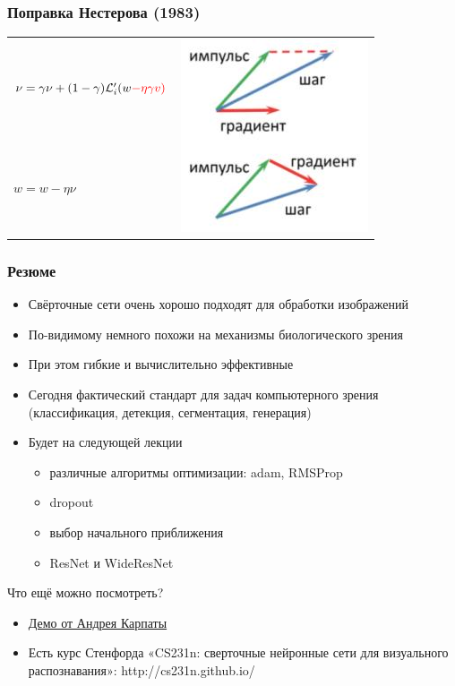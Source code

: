 \documentclass[fullscreen=true, bookmarks=true, hyperref={pdfencoding=unicode}]{beamer}
\begin{document}
\begin{frame}
  \frametitle{Поправка Нестерова (1983)}

\begin{tabular}{lr}
  $\nu = \gamma \nu + (1 - \gamma) \mathcal{L}_i^\prime (w \color{red}{- \eta \gamma v})$ &
  \multirow{2}{*}{\includegraphics[keepaspectratio,
                   width=0.3\paperwidth]{nesterov.jpg}} \\
    $w = w - \eta \nu$ &
\end{tabular}

\end{frame}


\begin{frame}
  \frametitle{Резюме}
  \begin{itemize}
    \item Свёрточные сети очень хорошо подходят для обработки изображений
    \item По-видимому немного похожи на механизмы биологического зрения
    \item При этом гибкие и вычислительно эффективные
    \item Сегодня фактический стандарт для задач компьютерного зрения (классификация, детекция, сегментация, генерация)
    \pause
    \item Будет на следующей лекции
      \begin{itemize}
        \item различные алгоритмы оптимизации: adam, RMSProp
        \item dropout
        \item выбор начального приближения
        \item ResNet и WideResNet
      \end{itemize}
  \end{itemize}

  \pause
  Что ещё можно посмотреть?
  \begin{itemize}
    \item \href{https://cs.stanford.edu/people/karpathy/convnetjs/}{Демо от Андрея Карпаты}
    \item Есть курс Стенфорда «CS231n: сверточные нейронные сети для визуального распознавания»: http://cs231n.github.io/
  \end{itemize}
\end{frame}
\end{document}
